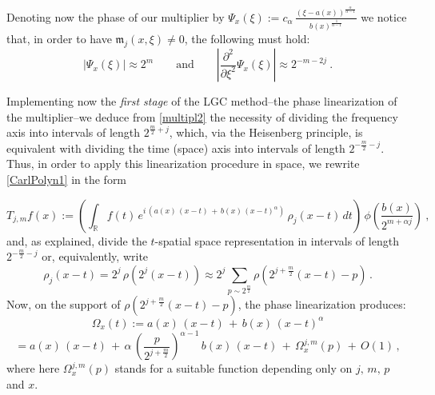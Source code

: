 \documentclass[a4paper,reqno]{amsart}
\numberwithin{equation}{section}
\theoremstyle{definition}
\newcommand{\R}{\mathbb{R}}
\def\a{\alpha}
\begin{document}
Denoting now the phase of our multiplier by $\Psi_x(\xi):=c_{\a}\, \frac{(\xi-a(x))^{\frac{\a}{\a-1}}}{b(x)^{\frac{1}{\a-1}}}$  we notice that, in order to have $\mathfrak{m}_j(x,\xi)\not=0$, the following must hold:
\begin{equation}\label{multipl2}
	|\Psi_x(\xi)|\approx 2^m\qquad\textrm{and}\qquad \left|\frac{\partial^2}{\partial \xi^2}\Psi_x(\xi)\right|\approx 2^{-m-2j}\:.
\end{equation}

Implementing now the \emph{first stage} of the LGC method--the phase linearization of the multiplier--we deduce from \eqref{multipl2} the necessity of dividing the frequency axis into intervals of length $2^{\frac{m}{2}+j}$, which, via the Heisenberg principle, is equivalent with dividing the time (space) axis into intervals of length $2^{-\frac{m}{2}-j}$.  Thus, in order to apply this linearization procedure in space, we rewrite \eqref{CarlPolyn1} in the form

\begin{equation}\label{CarlPolyn01}
	T_{j,m} f(x):=\left(\int_{\R} f(t)\,e^{i\,(a(x)\,(x-t)\,+\,b(x)\,(x-t)^{\a})}\,\rho_j(x-t)\,dt\right)\,\phi\left(\frac{b(x)}{2^{m+\a j}}\right)\:,
\end{equation}
and, as explained, divide the $t$-spatial space representation in intervals of length $2^{-\frac{m}{2}-j}$ or, equivalently, write
$$\rho_j(x-t)=2^j\,\rho(2^j(x-t))\approx 2^j\sum_{p\sim 2^{\frac{m}{2}}} \rho(2^{j+\frac{m}{2}}(x-t)-p)\,.$$
Now, on the support of $\rho(2^{j+\frac{m}{2}}(x-t)-p)$, the phase linearization produces:
\begin{equation}\label{Spphase}
\end{equation}
$$\Omega_x(t):=a(x)\,(x-t)\,+\,b(x)\,(x-t)^{\a}$$
$$=a(x)\,(x-t)\,+\,\a\,\left(\frac{p}{2^{j+\frac{m}{2}}}\right)^{\a-1}\,b(x)\,(x-t)\,+\,\Omega_x^{j,m}(p)\,+\,O(1)\,,$$
where here $\Omega_x^{j,m}(p)$ stands for a suitable function depending only on $j,\,m,\, p$ and $x$.
\end{document}
